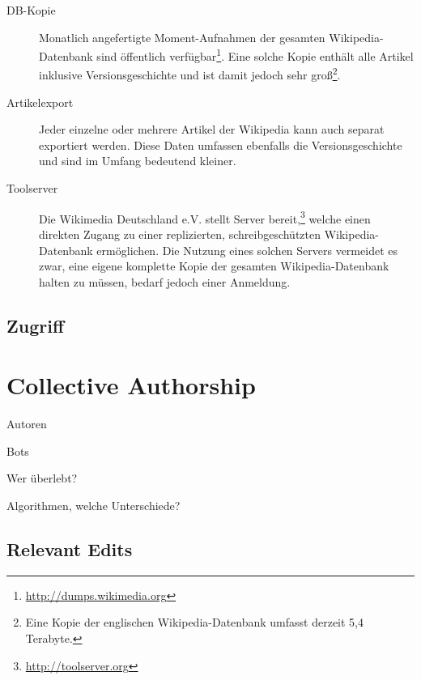 \begin{description}
\item[DB-Kopie] Monatlich angefertigte Moment-Aufnahmen der gesamten Wikipedia-Datenbank sind öffentlich verfügbar\footnote{\url{http://dumps.wikimedia.org}}. Eine solche Kopie enthält alle Artikel inklusive Versionsgeschichte und ist damit jedoch sehr groß\footnote{Eine Kopie der englischen Wikipedia-Datenbank umfasst derzeit 5,4 Terabyte.}.
\item[Artikelexport] Jeder einzelne oder mehrere Artikel der Wikipedia kann auch separat exportiert werden. Diese Daten umfassen ebenfalls die Versionsgeschichte und sind im Umfang bedeutend kleiner.
\item[Toolserver] Die Wikimedia Deutschland e.V. stellt Server bereit,\footnote{\url{http://toolserver.org}} welche einen direkten Zugang zu einer replizierten, schreibgeschützten Wikipedia-Datenbank ermöglichen. Die Nutzung eines solchen Servers vermeidet es zwar, eine eigene komplette Kopie der gesamten Wikipedia-Datenbank halten zu müssen, bedarf jedoch einer Anmeldung.
\end{description}

\subsection{Zugriff}



\section{Collective Authorship}


\begin{todos}
    \item Autoren
    \item Bots
    \item Wer überlebt?
    \item Algorithmen, welche Unterschiede?
\end{todos}

\subsection{Relevant Edits}





